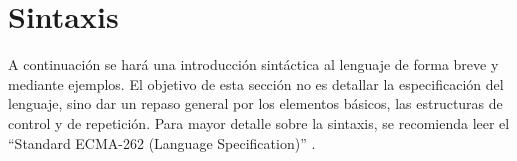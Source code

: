 \section{Sintaxis}

A continuación se hará una introducción sintáctica al lenguaje de forma breve y mediante ejemplos. El objetivo de esta sección no es detallar la especificación del lenguaje, sino dar un repaso general por los elementos básicos, las estructuras de control y de repetición. Para mayor detalle sobre la sintaxis, se recomienda leer el "`Standard ECMA-262 (Language Specification)"' \cite{EcmaScript:15}.




